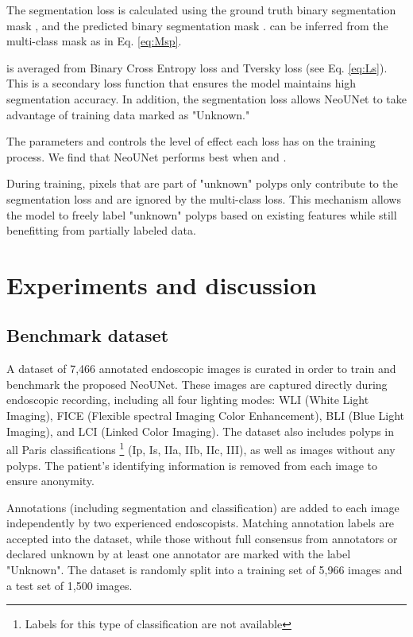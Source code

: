 \documentclass[runningheads]{llncs}
\newcommand{\ModelName}{NeoUNet\xspace}
\begin{document}
	The segmentation loss  is calculated using the ground truth binary segmentation mask , and the predicted binary segmentation mask .  can be inferred from the multi-class mask  as in Eq. \eqref{eq:Msp}.

	

	 is averaged from Binary Cross Entropy loss and Tversky loss (see Eq. \eqref{eq:Ls}). This is a secondary loss function that ensures the model maintains high segmentation accuracy. In addition, the segmentation loss allows \ModelName to take advantage of training data marked as "Unknown."

	

	The parameters  and  controls the level of effect each loss has on the training process. We find that \ModelName performs best when  and .

	During training, pixels that are part of "unknown" polyps only contribute to the segmentation loss and are ignored by the multi-class loss. This mechanism allows the model to freely label "unknown" polyps based on existing features while still benefitting from partially labeled data.

	\section{Experiments and discussion}
	\label{sec:experiment}
	\subsection{Benchmark dataset}
	\label{sec:experiemn}
	A dataset of 7,466 annotated endoscopic images is curated in order to train and benchmark the proposed \ModelName{}. These images are captured directly during endoscopic recording, including all four lighting modes: WLI (White Light Imaging), FICE (Flexible spectral Imaging Color Enhancement), BLI (Blue Light Imaging), and LCI (Linked Color Imaging). The dataset also includes polyps in all Paris classifications \cite{lambert2003paris} \footnote{Labels for this type of classification are not available} (Ip, Is, IIa, IIb, IIc, III), as well as images without any polyps. The patient's identifying information is removed from each image to ensure anonymity.

	Annotations (including segmentation and classification) are added to each image independently by two experienced endoscopists. Matching annotation labels are accepted into the dataset, while those without full consensus from annotators or declared unknown by at least one annotator are marked with the label "Unknown". The dataset is randomly split into a training set of 5,966 images and a test set of 1,500 images.
\end{document}
